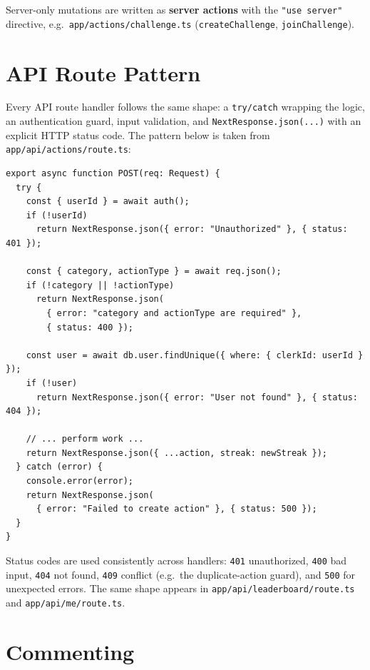 \documentclass[11pt]{article}
\begin{document}
Server-only mutations are written as \textbf{server actions} with the
\texttt{"use server"} directive, e.g.\ \texttt{app/actions/challenge.ts}
(\texttt{createChallenge}, \texttt{joinChallenge}).

\section{API Route Pattern}

Every API route handler follows the same shape: a \texttt{try/catch} wrapping
the logic, an authentication guard, input validation, and
\texttt{NextResponse.json(...)} with an explicit HTTP status code. The pattern
below is taken from \texttt{app/api/actions/route.ts}:

\begin{verbatim}
export async function POST(req: Request) {
  try {
    const { userId } = await auth();
    if (!userId)
      return NextResponse.json({ error: "Unauthorized" }, { status: 401 });

    const { category, actionType } = await req.json();
    if (!category || !actionType)
      return NextResponse.json(
        { error: "category and actionType are required" },
        { status: 400 });

    const user = await db.user.findUnique({ where: { clerkId: userId } });
    if (!user)
      return NextResponse.json({ error: "User not found" }, { status: 404 });

    // ... perform work ...
    return NextResponse.json({ ...action, streak: newStreak });
  } catch (error) {
    console.error(error);
    return NextResponse.json(
      { error: "Failed to create action" }, { status: 500 });
  }
}
\end{verbatim}

Status codes are used consistently across handlers: \texttt{401} unauthorized,
\texttt{400} bad input, \texttt{404} not found, \texttt{409} conflict (e.g.\
the duplicate-action guard), and \texttt{500} for unexpected errors. The same
shape appears in \texttt{app/api/leaderboard/route.ts} and
\texttt{app/api/me/route.ts}.

\section{Commenting}
\end{document}
